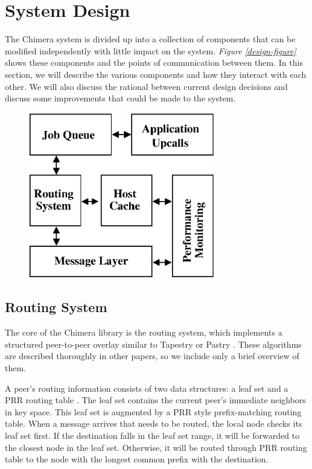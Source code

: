 \section{System Design}
\label{design}

The Chimera system is divided up into a collection of components that
can be modified independently with little impact on the system.
{\em Figure \ref{design-figure}} shows these components and the points
of communication between them.
In this section, we will describe the various components
and how they interact with each other. We will also discuss the rational
between current design decisions and discuss some improvements that could
be made to the system.

\begin{figure}
\includegraphics[width=3.2in]{design.eps}
\end{figure}

\subsection{Routing System}
\label{routing}

The core of the Chimera library is the routing system, which implements
a structured peer-to-peer overlay similar to Tapestry or Pastry
\cite{tapestry, pastry}. These algorithms are described thoroughly in
other papers, so we include only a brief overview of them.

A peer's routing information consists of two data structures: a leaf set
and a PRR routing table \cite{plaxtonnets}. The leaf set
contains the current peer's immediate neighbors in key space. This
leaf set is augmented by a PRR style prefix-matching routing table.
When a message arrives that needs to be routed, the local node checks
its leaf set
first. If the destination falls in the leaf set range, it will be forwarded to
the closest node in the leaf set. Otherwise,
it will be routed through PRR routing table to the node with the
longest common prefix with the destination.

